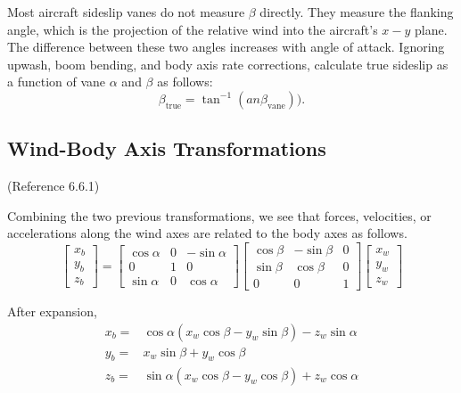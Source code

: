 \documentclass[
]{book}
\begin{document}
Most aircraft sideslip vanes do not measure \(\beta\) directly. They measure the flanking angle, which is the projection of the relative wind into the aircraft's \(x-y\) plane. The difference between these two angles increases with angle of attack. Ignoring upwash, boom bending, and body axis rate corrections, calculate true sideslip as a function of vane \(\alpha\) and \(\beta\) as follows:
\[\beta_{\mathrm{true}} = \tan^{-1} (an\beta_{\mathrm{vane}})).\]

\hypertarget{wind-body-axis-transformations}{%
\subsection{Wind-Body Axis Transformations}\label{wind-body-axis-transformations}}

(Reference 6.6.1)

Combining the two previous transformations, we see that forces, velocities, or accelerations along the wind axes are related to the body axes as follows.
\[
\begin{bmatrix}
x_b \\
y_b \\
z_b
\end{bmatrix} = 
\begin{bmatrix}
\cos \alpha & 0 & -\sin \alpha \\
0 & 1 & 0 \\
\sin \alpha & 0 & \cos \alpha
\end{bmatrix}
\begin{bmatrix}
\cos \beta & -\sin \beta & 0 \\
\sin \beta & \cos \beta & 0 \\
0 & 0 & 1
\end{bmatrix}
\begin{bmatrix}
x_w \\
y_w \\
z_w 
\end{bmatrix}
\]

After expansion,
\begin{align}
x_b =& \cos \alpha (x_w \cos \beta - y_w \sin \beta) - z_w \sin \alpha \\
y_b =& x_w \sin \beta + y_w \cos \beta \\
z_b =& \sin \alpha (x_w \cos \beta - y_w \cos \beta) + z_w \cos \alpha 
\end{align}
\end{document}
